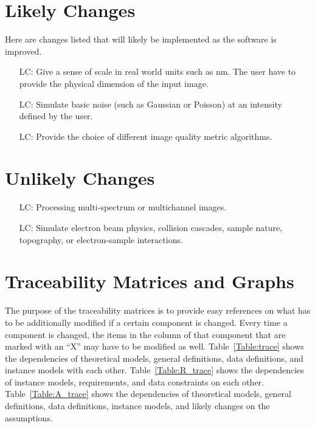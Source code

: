 \documentclass[12pt]{article}
\newcounter{lcnum} %
\begin{document}
\section{Likely Changes}    
Here are changes listed that will likely be implemented as the software is improved.

\noindent \begin{itemize}

\item[LC\refstepcounter{lcnum}\thelcnum\label{LC_realUnits}:] Give a sense of scale in real world units such as \si{nm}. The user have to provide the physical dimension of the input image.

\item[LC\refstepcounter{lcnum}\thelcnum\label{LC_simNoise}:] Simulate basic noise (such as Gaussian or Poisson) at an intensity defined by the user.

\item[LC\refstepcounter{lcnum}\thelcnum\label{LC_imgMetricAlgos}:] Provide the choice of different image quality metric algorithms.

\end{itemize}

\section{Unlikely Changes}    

\noindent \begin{itemize}

\item[LC\refstepcounter{lcnum}\thelcnum\label{LC_multichannel}:] Processing multi-spectrum or multichannel images.

\item[LC\refstepcounter{lcnum}\thelcnum\label{LC_physics}:] Simulate electron beam physics, collision cascades, sample nature, topography, or electron-sample interactions.

\end{itemize}

\section{Traceability Matrices and Graphs}

The purpose of the traceability matrices is to provide easy references on what
has to be additionally modified if a certain component is changed.  Every time a
component is changed, the items in the column of that component that are marked
with an ``X'' may have to be modified as well.  Table~\ref{Table:trace} shows the
dependencies of theoretical models, general definitions, data definitions, and
instance models with each other. Table~\ref{Table:R_trace} shows the
dependencies of instance models, requirements, and data constraints on each
other. Table~\ref{Table:A_trace} shows the dependencies of theoretical models,
general definitions, data definitions, instance models, and likely changes on
the assumptions.
\end{document}
